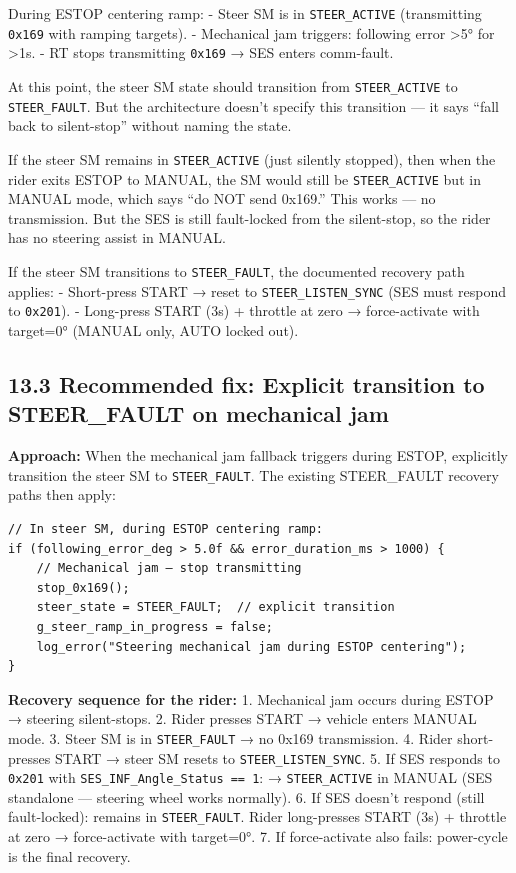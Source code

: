 \documentclass[12pt,a4paper,oneside]{report}
\begin{document}
During ESTOP centering ramp: - Steer SM is in \texttt{STEER\_ACTIVE}
(transmitting \texttt{0x169} with ramping targets). - Mechanical jam triggers:
following error \textgreater5° for \textgreater1s. - RT stops transmitting
\texttt{0x169} → SES enters comm-fault.

At this point, the steer SM state should transition from \texttt{STEER\_ACTIVE}
to \texttt{STEER\_FAULT}. But the architecture doesn't specify this transition
--- it says ``fall back to silent-stop'' without naming the state.

If the steer SM remains in \texttt{STEER\_ACTIVE} (just silently stopped), then
when the rider exits ESTOP to MANUAL, the SM would still be
\texttt{STEER\_ACTIVE} but in MANUAL mode, which says ``do NOT send 0x169.''
This works --- no transmission. But the SES is still fault-locked from the
silent-stop, so the rider has no steering assist in MANUAL.

If the steer SM transitions to \texttt{STEER\_FAULT}, the documented recovery
path applies: - Short-press START → reset to \texttt{STEER\_LISTEN\_SYNC} (SES
must respond to \texttt{0x201}). - Long-press START (3s) + throttle at zero →
force-activate with target=0° (MANUAL only, AUTO locked out).

\subsection{13.3 Recommended fix: Explicit transition to STEER\_FAULT on
mechanical
jam}\label{recommended-fix-explicit-transition-to-steer_fault-on-mechanical-jam}

\textbf{Approach:} When the mechanical jam fallback triggers during ESTOP,
explicitly transition the steer SM to \texttt{STEER\_FAULT}. The existing
STEER\_FAULT recovery paths then apply:

\begin{verbatim}
// In steer SM, during ESTOP centering ramp:
if (following_error_deg > 5.0f && error_duration_ms > 1000) {
    // Mechanical jam — stop transmitting
    stop_0x169();
    steer_state = STEER_FAULT;  // explicit transition
    g_steer_ramp_in_progress = false;
    log_error("Steering mechanical jam during ESTOP centering");
}
\end{verbatim}

\textbf{Recovery sequence for the rider:} 1. Mechanical jam occurs during ESTOP
→ steering silent-stops. 2. Rider presses START → vehicle enters MANUAL mode. 3.
Steer SM is in \texttt{STEER\_FAULT} → no 0x169 transmission. 4. Rider
short-presses START → steer SM resets to \texttt{STEER\_LISTEN\_SYNC}. 5. If
SES responds to \texttt{0x201} with \texttt{SES\_INF\_Angle\_Status\ ==\ 1}: →
\texttt{STEER\_ACTIVE} in MANUAL (SES standalone --- steering wheel works
normally). 6. If SES doesn't respond (still fault-locked): remains in
\texttt{STEER\_FAULT}. Rider long-presses START (3s) + throttle at zero →
force-activate with target=0°. 7. If force-activate also fails: power-cycle is
the final recovery.
\end{document}
